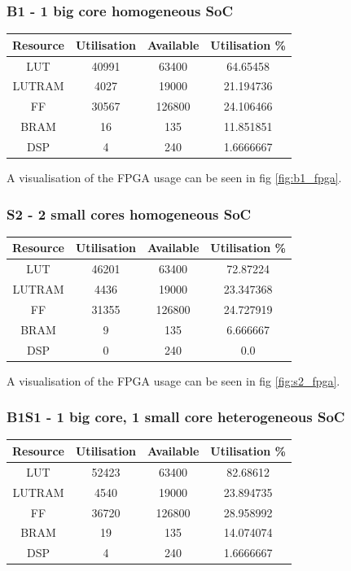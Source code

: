 \subsubsection{B1 - 1 big core homogeneous SoC}
\begin{center}
\begin{tabular}{c c c c}
    Resource & Utilisation & Available & Utilisation \% \\
    \hline
    LUT	& 40991 & 63400 & 64.65458 \\
    \hline
    LUTRAM & 4027 & 19000 & 21.194736 \\
    \hline
    FF & 30567 & 126800 & 24.106466 \\
    \hline
    BRAM & 16 & 135 & 11.851851 \\
    \hline
    DSP & 4 & 240 & 1.6666667 \\
    \hline
\end{tabular}
\end{center}

A visualisation of the FPGA usage can be seen in fig \ref{fig:b1_fpga}.

\subsubsection{S2 - 2 small cores homogeneous SoC}
\begin{center}
\begin{tabular}{c c c c}
    Resource & Utilisation & Available & Utilisation \% \\
    \hline
    LUT	& 46201	& 63400	& 72.87224 \\
    \hline
    LUTRAM	& 4436 & 19000	& 23.347368 \\
    \hline
    FF & 31355 & 126800 & 24.727919 \\
    \hline
    BRAM & 9 & 135 & 6.666667 \\
    \hline
    DSP & 0 & 240 & 0.0 \\
    \hline
\end{tabular}
\end{center}

A visualisation of the FPGA usage can be seen in fig \ref{fig:s2_fpga}.

\subsubsection{B1S1 - 1 big core, 1 small core heterogeneous SoC}
\begin{center}
\begin{tabular}{c c c c}
    Resource & Utilisation & Available & Utilisation \% \\
    \hline
    LUT & 52423 & 63400 & 82.68612 \\
    \hline
    LUTRAM & 4540 & 19000 & 23.894735 \\
    \hline
    FF & 36720 & 126800 & 28.958992 \\
    \hline
    BRAM & 19 & 135 & 14.074074 \\
    \hline
    DSP & 4 & 240 & 1.6666667 \\
    \hline
\end{tabular}
\end{center}

